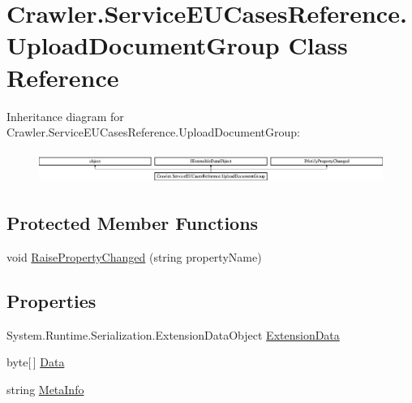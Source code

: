 \hypertarget{class_crawler_1_1_service_e_u_cases_reference_1_1_upload_document_group}{\section{Crawler.\-Service\-E\-U\-Cases\-Reference.\-Upload\-Document\-Group Class Reference}
\label{class_crawler_1_1_service_e_u_cases_reference_1_1_upload_document_group}
}
Inheritance diagram for Crawler.\-Service\-E\-U\-Cases\-Reference.\-Upload\-Document\-Group\-:\begin{figure}[H]
\begin{center}
\leavevmode
\includegraphics[height=1.045752cm]{class_crawler_1_1_service_e_u_cases_reference_1_1_upload_document_group}
\end{center}
\end{figure}
\subsection*{Protected Member Functions}
\begin{DoxyCompactItemize}
\item 
void \hyperlink{class_crawler_1_1_service_e_u_cases_reference_1_1_upload_document_group_adb6665559ba1039c96c155c6580e31d5}{Raise\-Property\-Changed} (string property\-Name)
\end{DoxyCompactItemize}
\subsection*{Properties}
\begin{DoxyCompactItemize}
\item 
System.\-Runtime.\-Serialization.\-Extension\-Data\-Object \hyperlink{class_crawler_1_1_service_e_u_cases_reference_1_1_upload_document_group_a6e5a47edc856ec02a5f3a763e37e250d}{Extension\-Data}
\item 
byte\mbox{[}$\,$\mbox{]} \hyperlink{class_crawler_1_1_service_e_u_cases_reference_1_1_upload_document_group_a49ce75373990c1bf9b44badb76dc8f25}{Data}
\item 
string \hyperlink{class_crawler_1_1_service_e_u_cases_reference_1_1_upload_document_group_a6dcebd3038e323761e99814c7828d9cf}{Meta\-Info}
\end{DoxyCompactItemize}
